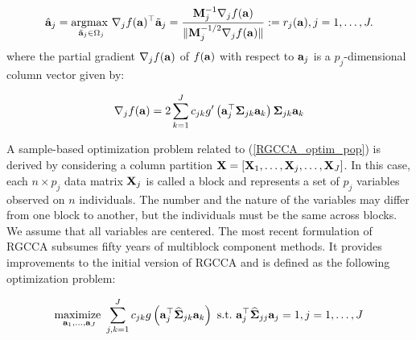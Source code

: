 \documentclass[
]{jss}
\begin{document}
\begin{equation}
\hat{\mathbf{a}}_j = \underset{\tilde{\mathbf{a}}_j\in\Omega_j}{\mathrm{argmax~}}  \nabla_j f(\mathbf{a})^\top \tilde{\mathbf{a}}_j = \frac{\mathbf{M}_j^{-1}\mathbf{\nabla}_j f(\mathbf{a})}{\Vert \mathbf{M}_j^{-1/2}\mathbf{\nabla}_j f(\mathbf{a}) \Vert} := r_j(\mathbf{a}) , j=1, \ldots, J.
\label{RGCCA_update}
\end{equation} where the partial gradient \(\mathbf{\nabla}_j f(\mathbf{a})\) of
\(f(\mathbf{a})\) with respect to \(\mathbf{a}_j\) is a \(p_j\)-dimensional column
vector given by:

\begin{equation}
\mathbf{\nabla}_j f(\mathbf{a})=2\sum_{k=1}^{J}c_{jk}g'\left(\mathbf{a}_j^\top \mathbf{\Sigma}_{jk} \mathbf{a}_k \right) \mathbf{\Sigma}_{jk} \mathbf{a}_k
\label{grad_obj_function}
\end{equation}

A sample-based optimization problem related to (\ref{RGCCA_optim_pop})
is derived by considering a column partition
\(\mathbf{X} = [\mathbf{X}_1, \ldots, \mathbf{X}_j, \ldots, \mathbf{X}_J]\). In this case, each
\(n \times p_j\) data matrix \(\mathbf{X}_j\) is called a block and represents a
set of \(p_j\) variables observed on \(n\) individuals. The number and
the nature of the variables may differ from one block to another, but
the individuals must be the same across blocks. We assume that all
variables are centered. The most recent formulation of RGCCA
\citep{Tenenhaus2017} subsumes fifty years of multiblock component
methods. It provides improvements to the initial version of RGCCA
\citep{Tenenhaus2011} and is defined as the following optimization
problem:

\begin{equation}
\underset{\mathbf{a}_1, \ldots, \mathbf{a}_J}{\text{maximize~}}
\sum_{j, k = 1}^J c_{jk} g\left(\mathbf{a}_j^\top
\widehat{\mathbf{\Sigma}}_{jk}\mathbf{a}_k \right)\\ \mathrm{~s.t.~}\mathbf{a}_j^\top\widehat{\mathbf{\Sigma}}_{jj}\mathbf{a}_j=1, j =1, \ldots, J
\label{opti_RGCCA_emp}
\end{equation}
\end{document}
